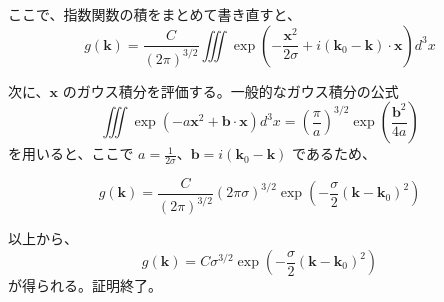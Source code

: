 \documentclass{article}
\begin{document}
ここで、指数関数の積をまとめて書き直すと、
\begin{equation}
    g(\bm{k}) = \frac{C}{(2\pi)^{3/2}} \iiint \exp \left( - \frac{\bm{x}^2}{2\sigma} + i (\bm{k}_0 - \bm{k}) \cdot \bm{x} \right) d^3 x
\end{equation}

次に、$\bm{x}$ のガウス積分を評価する。一般的なガウス積分の公式
\begin{equation}
    \iiint \exp \left( -a \bm{x}^2 + \bm{b} \cdot \bm{x} \right) d^3 x = \left( \frac{\pi}{a} \right)^{3/2} \exp \left( \frac{\bm{b}^2}{4a} \right)
\end{equation}
を用いると、ここで $a = \frac{1}{2\sigma}$、$\bm{b} = i (\bm{k}_0 - \bm{k})$ であるため、

\begin{equation}
    g(\bm{k}) = \frac{C}{(2\pi)^{3/2}} \left( 2\pi\sigma \right)^{3/2} \exp \left( -\frac{\sigma}{2} (\bm{k} - \bm{k}_0)^2 \right)
\end{equation}

以上から、
\begin{equation}
    g(\bm{k}) = C \sigma^{3/2} \exp \left( - \frac{\sigma}{2} (\bm{k} - \bm{k}_0)^2 \right)
\end{equation}
が得られる。証明終了。
\end{document}
